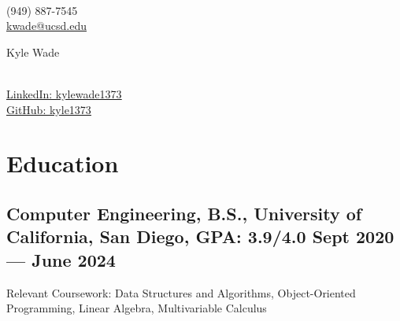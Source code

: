 \documentclass[a4,10pt]{article}
\newcommand{\subtext}[1]{
#1\par\vspace{-0.2cm}}
\begin{document}
\begin{center}
    \begin{minipage}[b]{0.24\textwidth}
            \large \\
            \normalsize (949) 887-7545 \\
            \normalsize
            \href{mailto:kwade@ucsd.edu}{kwade@ucsd.edu} 
    \end{minipage}%
    \begin{minipage}[b]{0.5\textwidth}
            \centering
            {\HUGE Kyle Wade} \\ %
            \vspace{0.1cm}
            {\color{UI_blue} \Large{}} \\
    \end{minipage}%
    \begin{minipage}[b]{0.24\textwidth}
            \flushright \normalsize  %
            {\href{https://www.linkedin.com/in/kylewade1373/}{\underline{\textcolor{linkblue}{LinkedIn: kylewade1373}}} } \\
            \vspace{.05cm}
            \href{https://github.com/kyle1373}{\underline{\textcolor{linkblue}{GitHub: kyle1373}}}
    \end{minipage} 
    \vspace{-0.45cm} 
\end{center}

\section{Education }
\subsection*{Computer Engineering, B.S., {\normalsize \normalfont University of California, San Diego, GPA: 3.9/4.0} \hfill Sept 2020 --- June 2024} 
\subtext{Relevant Coursework: Data Structures and Algorithms, Object-Oriented Programming, Linear Algebra, Multivariable Calculus}
\vspace{0cm}
\end{document}
